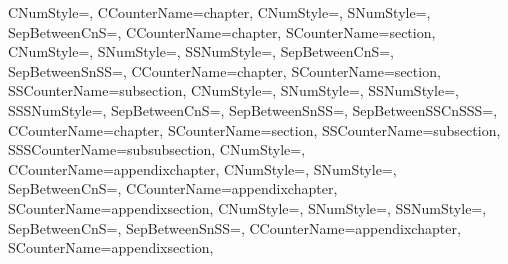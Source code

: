{%
  {%
    CNumStyle=\GetCTitleNumberFormatCNumStyle,%
    CCounterName=chapter,%
  }{\GetGeneralChapterNumberingFormatString}%
  {%
    CNumStyle=\GetSTitleNumberFormatCNumStyle,%
    SNumStyle=\GetSTitleNumberFormatSNumStyle,%
    SepBetweenCnS=\GetSTitleNumberFormatSepBetweenCnS,%
    CCounterName=chapter,%
    SCounterName=section,%
  }{\GetGeneralSectionNumberingFormatString}%
  {%
    CNumStyle=\GetSSTitleNumberFormatCNumStyle,%
    SNumStyle=\GetSSTitleNumberFormatSNumStyle,%
    SSNumStyle=\GetSSTitleNumberFormatSSNumStyle,%
    SepBetweenCnS=\GetSSTitleNumberFormatSepBetweenCnS,%
    SepBetweenSnSS=\GetSSTitleNumberFormatSepBetweenSnSS,%
    CCounterName=chapter,%
    SCounterName=section,%
    SSCounterName=subsection,%
  }{\GetGeneralSubSectionNumberingFormatString}%
  {%
    CNumStyle=\GetSSSTitleNumberFormatCNumStyle,%
    SNumStyle=\GetSSSTitleNumberFormatSNumStyle,%
    SSNumStyle=\GetSSSTitleNumberFormatSSNumStyle,%
    SSSNumStyle=\GetSSSTitleNumberFormatSSSNumStyle,%
    SepBetweenCnS=\GetSSSTitleNumberFormatSepBetweenCnS,%
    SepBetweenSnSS=\GetSSSTitleNumberFormatSepBetweenSnSS,%
    SepBetweenSSCnSSS=\GetSSSTitleNumberFormatSepBetweenSSCnSSS,%
    CCounterName=chapter,%
    SCounterName=section,%
    SSCounterName=subsection,%
    SSSCounterName=subsubsection,%
  }{\GetGeneralSubSubSectionNumberingFormatString}%
  {%
    CNumStyle=\GetAppendixCTitleNumberFormatCNumStyle,%
    CCounterName=appendixchapter,%
  }{\GetAppendixChapterNumberingFormatString}%
  {%
    CNumStyle=\GetAppendixSTitleNumberFormatCNumStyle,%
    SNumStyle=\GetAppendixSTitleNumberFormatSNumStyle,%
    SepBetweenCnS=\GetAppendixSTitleNumberFormatSepBetweenCnS,%
    CCounterName=appendixchapter,%
    SCounterName=appendixsection,%
  }{\GetAppendixSectionNumberingFormatString}%
  {%
    CNumStyle=\GetAppendixSSTitleNumberFormatCNumStyle,%
    SNumStyle=\GetAppendixSSTitleNumberFormatSNumStyle,%
    SSNumStyle=\GetAppendixSSTitleNumberFormatSSNumStyle,%
    SepBetweenCnS=\GetAppendixSSTitleNumberFormatSepBetweenCnS,%
    SepBetweenSnSS=\GetAppendixSSTitleNumberFormatSepBetweenSnSS,%
    CCounterName=appendixchapter,%
    SCounterName=appendixsection,%
}}
